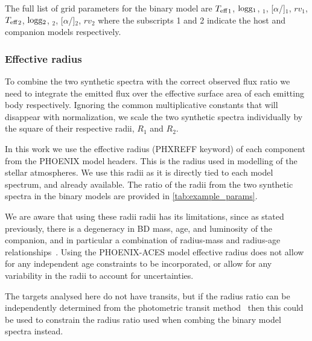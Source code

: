 {\red{} The full list of grid parameters for the binary model are \({T_{\mathrm{eff}}}_{1}\),  \(\textrm{logg}{}_1\), \feh{}\(_1\), [\(\alpha\)/]\(_1\), \({rv}_1\), \({T_{\mathrm{eff}}}_{2}\), \(\textrm{logg}{}_2\), \feh{}\(_2\), [\(\alpha\)/]\(_2\), \({rv}_2\) where the subscripts 1 and 2 indicate the host and companion models respectively.}






\subsubsection{Effective radius}
\label{subsection-radius}

To combine the two synthetic spectra with the correct observed flux ratio we need to integrate the emitted flux over the effective surface area of each emitting body respectively.
Ignoring the common multiplicative constants that will disappear with normalization, we scale the two synthetic spectra individually by the square of their respective radii, \(R_1\) and \(R_2\).

In this work we use the effective radius (PHXREFF keyword) of each component from the {PHOENIX} model headers.
This is the radius used in modelling of the stellar atmospheres.
We use this radii as it is directly tied to each model spectrum, and already available.
The ratio of the radii from the two synthetic spectra in the binary models are provided in \cref{tab:example_params}.

We are aware that using these radii radii has its limitations, since as stated previously, there is a degeneracy in {BD} mass, age, and luminosity of the companion, and in particular a combination of radius-mass and radius-age relationships~\citep{sorahana_radii_2013}.
Using the {PHOENIX-ACES} model effective radius does not allow for any independent age constraints to be incorporated, or allow for any variability in the radii to account for uncertainties.

The targets analysed here do not have transits, but if the radius ratio can be independently determined from the photometric transit method~\citep{deeg_photometric_1998} then this could be used to constrain the radius ratio used when combing the binary model spectra instead.


